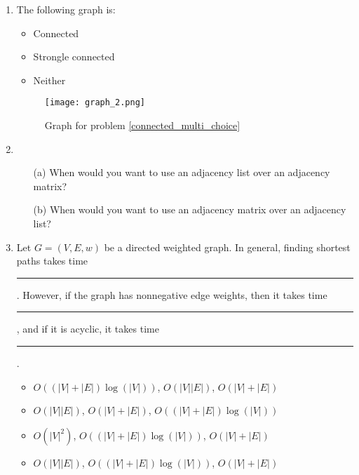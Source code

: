\documentclass[12pt]{article}
\begin{document}
\newpage
\begin{enumerate}
    \item The following graph is:
    \begin{itemize}
        \item Connected
        \item Strongle connected
        \item Neither
    \end{itemize}
    \label{connected_multi_choice}
    \begin{figure}[h]
        \centering
        \caption{Graph for problem \ref{connected_multi_choice}}
        \texttt{[image: graph\_2.png]}
    \end{figure}
    \item 
        \begin{itemize}
            \item[(a)] When would you want to use an adjacency list over an adjacency matrix? \vspace{4cm}
            \item[(b)] When would you want to use an adjacency matrix over an adjacency list? \vspace{4cm}
        \end{itemize}
    \item Let $G = (V,E,w)$ be a directed weighted graph. In general, finding shortest paths takes time \rule{1cm}{0.15mm}. However, if the graph has nonnegative edge weights, then it takes time \rule{1cm}{0.15mm}, and if it is acyclic, it takes time \rule{1cm}{0.15mm}. 
    \begin{itemize}
        \item $O((|V|+|E|)\log(|V|))$, $O(|V||E|)$, $O(|V|+|E|)$
        \item $O(|V||E|)$, $O(|V|+|E|)$, $O((|V|+|E|)\log(|V|))$
        \item $O(|V|^2)$, $O((|V|+|E|)\log(|V|))$, $O(|V|+|E|)$
        \item $O(|V||E|)$, $O((|V|+|E|)\log(|V|))$, $O(|V|+|E|)$
    \end{itemize} 


\end{enumerate}
\end{document}
